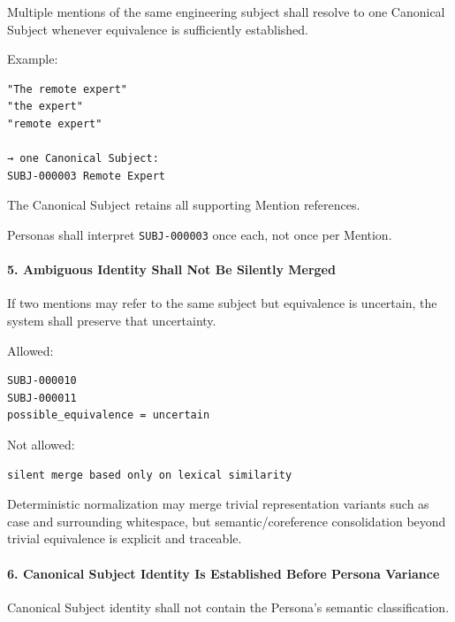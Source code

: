 Multiple mentions of the same engineering subject shall resolve to one Canonical Subject whenever equivalence is sufficiently established.

Example:

\begin{verbatim}
"The remote expert"
"the expert"
"remote expert"

→ one Canonical Subject:
SUBJ-000003 Remote Expert
\end{verbatim}

The Canonical Subject retains all supporting Mention references.

Personas shall interpret \texttt{SUBJ-000003} once each, not once per Mention.

\hypertarget{5-ambiguous-identity-shall-not-be-silently-merged}{%
\paragraph{5. Ambiguous Identity Shall Not Be Silently Merged}\label{5-ambiguous-identity-shall-not-be-silently-merged}}

If two mentions may refer to the same subject but equivalence is uncertain, the system shall preserve that uncertainty.

Allowed:

\begin{verbatim}
SUBJ-000010
SUBJ-000011
possible_equivalence = uncertain
\end{verbatim}

Not allowed:

\begin{verbatim}
silent merge based only on lexical similarity
\end{verbatim}

Deterministic normalization may merge trivial representation variants such as case and surrounding whitespace, but semantic/coreference consolidation beyond trivial equivalence is explicit and traceable.

\hypertarget{6-canonical-subject-identity-is-established-before-persona-variance}{%
\paragraph{6. Canonical Subject Identity Is Established Before Persona Variance}\label{6-canonical-subject-identity-is-established-before-persona-variance}}

Canonical Subject identity shall not contain the Persona's semantic classification.

